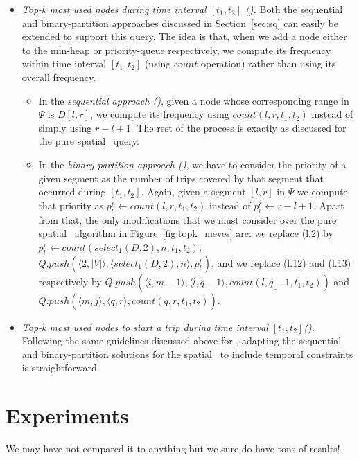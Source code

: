 \begin{itemize}[leftmargin=3mm]
	


\item {\em Top-k most used nodes during  time interval $[t_1,t_2]$ (\STtk).}
Both the sequential and binary-partition approaches discussed in Section~\ref{sec:sq} can easily
be extended to support this query. The idea is that, when we add a node either to the min-heap or priority-queue
respectively, we compute its frequency within time interval $[t_1,t_2]$ (using $count$ operation) 
rather than using its overall frequency.

\begin{itemize}
	\item In the {\em sequential approach (\Stkseq)}, given a node whose corresponding range
	in $\Psi$ is $D[l,r]$, we compute its frequency using $count(l,r,t_1,t_2)$ instead of simply using  $r-l+1$. 
	The rest of the process is exactly as discussed for the pure spatial \Stkseq\ query.
	
	\item In the {\em binary-partition approach (\Stkbin)}, we have to consider the priority of a
	given segment as the number of trips covered by that segment that occurred during $[t_1,t_2]$. Again, given
	a segment $[l,r]$ in $\Psi$ we compute that priority as $p_l^r \leftarrow count(l,r,t_1,t_2)$ instead of 
	$p_l^r \leftarrow  r-l+1$. Apart from
	that, the only modifications that we must consider over the pure spatial \Stkbin\ algorithm in 
	Figure~\ref{fig:topk_nieves} are:
	we replace (l.2) by $p_l^r \leftarrow count(select_1(D,2),n,t_1,t_2)$; $Q.push(\langle2, |V|\rangle, \langle select_1(D,2), n\rangle, \underline{p_l^r})$,
	and we replace  (l.12) and (l.13) respectively by 
	   $ Q.push(\langle i, m-1 \rangle, \langle l, q-1 \rangle, \underline{count(l,q-1,t_1,t_2)})$ and
	   $ Q.push(\langle m,   j \rangle, \langle q,   r \rangle, \underline{count(q,r,t_1,t_2)})$.
	
\end{itemize}


\item {\em Top-k most used nodes to start a trip during time interval $[t_1,t_2]$(\STtks).}
Following the same guidelines discussed above for \STtk, adapting the  sequential and 
binary-partition solutions for the spatial \Stks\ to include temporal constraints is straightforward.	
	
	
\end{itemize}


\section{Experiments}
We may have not compared it to anything but we sure do have tons of results!

